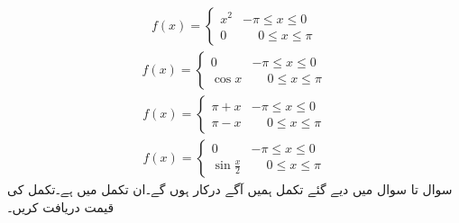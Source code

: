 \begin{align*}
f(x)=
\begin{cases}
x^2&-\pi \le x\le 0\\
0& \phantom{-}0 \le x \le \pi
\end{cases}
\end{align*}
\begin{align*}
f(x)=
\begin{cases}
0&-\pi \le x\le 0\\
\cos x& \phantom{-}0 \le x \le \pi
\end{cases}
\end{align*}
\begin{align*}
f(x)=
\begin{cases}
\pi+x&-\pi \le x\le 0\\
\pi-x& \phantom{-}0 \le x \le \pi
\end{cases}
\end{align*}
\begin{align*}
f(x)=
\begin{cases}
0&-\pi \le x\le 0\\
\sin \frac{x}{2}& \phantom{-}0 \le x \le \pi
\end{cases}
\end{align*}
سوال  تا سوال  میں دیے گئے تکمل ہمیں آگے درکار ہوں گے۔ان تکمل میں  ہے۔تکمل کی قیمت دریافت کریں۔

